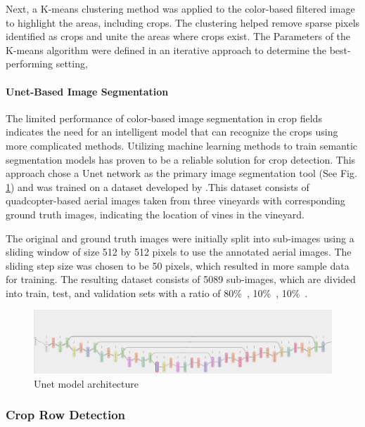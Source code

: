 \documentclass[conference]{IEEEtran}
\begin{document}
	Next, a K-means clustering method was applied to the color-based filtered image to highlight the areas, including crops. The clustering helped remove sparse pixels identified as crops and unite the areas where crops exist. The Parameters of the K-means algorithm were defined in an iterative approach to determine the best-performing setting,
	
	
	\paragraph{Unet-Based Image Segmentation}\leavevmode
	
	The limited performance of color-based image segmentation in crop fields indicates the need for an intelligent model that can recognize the crops using more complicated methods. Utilizing machine learning methods to train semantic segmentation models has proven to be a reliable solution for crop detection. This approach chose a Unet network as the primary image segmentation tool (See Fig.
	\ref{fig_Unet})
	and was trained on a dataset developed by
	\cite{b5}
	.This dataset consists of quadcopter-based aerial images taken from three vineyards with corresponding ground truth images, indicating the location of vines in the vineyard.
	
	The original and ground truth images were initially split into sub-images using a sliding window of size 512 by 512 pixels to use the annotated aerial images. The sliding step size was chosen to be 50 pixels, which resulted in more sample data for training. The resulting dataset consists of 5089 sub-images, which are divided into train, test, and validation sets with a ratio of 80\%\
	, 10\%\
	, 10\%\
	.
	
	
	\begin{figure}[t]
		\includegraphics[width=\linewidth]{UNET.png}
		\caption{Unet model architecture}
		\label{fig_Unet}
	\end{figure}
	
	\subsubsection{Crop Row Detection}\label{Crop Row Detection}\leavevmode
	
\end{document}
